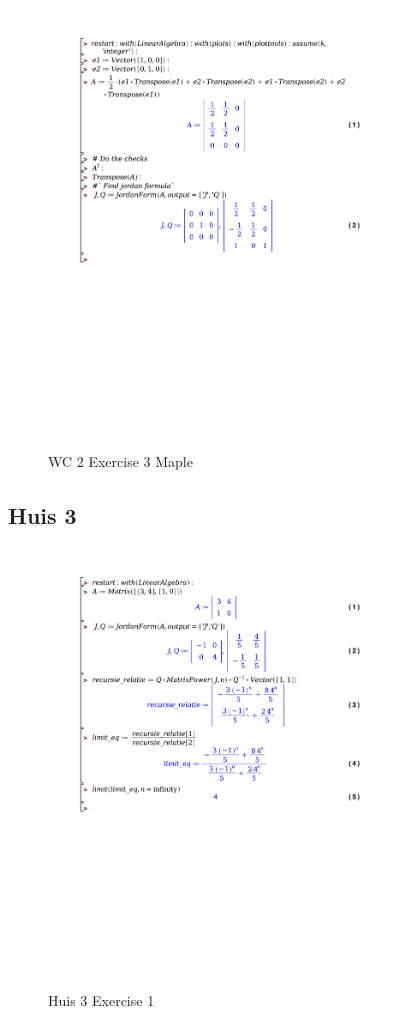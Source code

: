 \documentclass[a4paper]{report}
\begin{document}
\begin{figure}[H]
	\centering
	\includegraphics[width=0.8\textwidth]{exercises/wc_2_ex_3.pdf}
	\caption{WC 2 Exercise 3 Maple}
	\label{fig:wc_2_ex_3_maple}
\end{figure}

\subsection*{Huis 3}

\begin{figure}[H]
	\centering
	\includegraphics[width=0.8\textwidth]{exercises/huis_3_ex_1.pdf}
	\caption{Huis 3 Exercise 1}
	\label{fig:huis_3_ex_1_Maple}
\end{figure}
\end{document}
